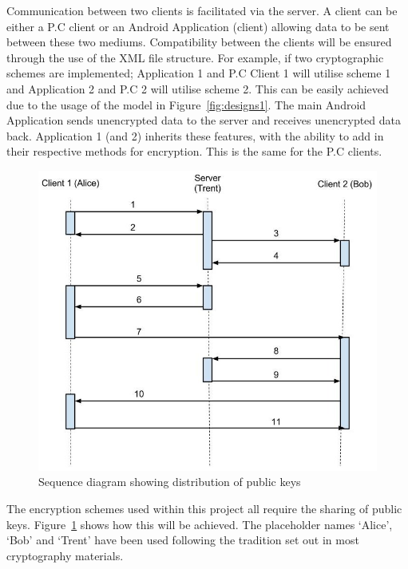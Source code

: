 \documentclass[a4paper,11pt]{article}
\begin{document}
Communication between two clients is facilitated via the server. A client can be either a P.C client or an Android Application (client) allowing data to be sent between these two mediums. Compatibility between the clients will be ensured through the use of the XML file structure. For example, if two cryptographic schemes are implemented; Application 1 and P.C Client 1 will utilise scheme 1 and Application 2 and P.C 2 will utilise scheme 2. This can be easily achieved due to the usage of the model in Figure~\ref{fig:designs1}. The main Android Application sends unencrypted data to the server and receives unencrypted data back. Application 1 (and 2) inherits these features, with the ability to add in their respective methods for encryption. This is the same for the P.C clients.

\begin{figure}[htb]
\centering
\includegraphics[scale=0.35]{designs3.jpg}
\caption{Sequence diagram showing distribution of public keys}
\label{fig:designs3}
\end{figure}

The encryption schemes used within this project all require the sharing of public keys. Figure~\ref{fig:designs3} shows how this will be achieved. The placeholder names ‘Alice’, ‘Bob’ and ‘Trent’ have been used following the tradition set out in most cryptography materials.
\end{document}
